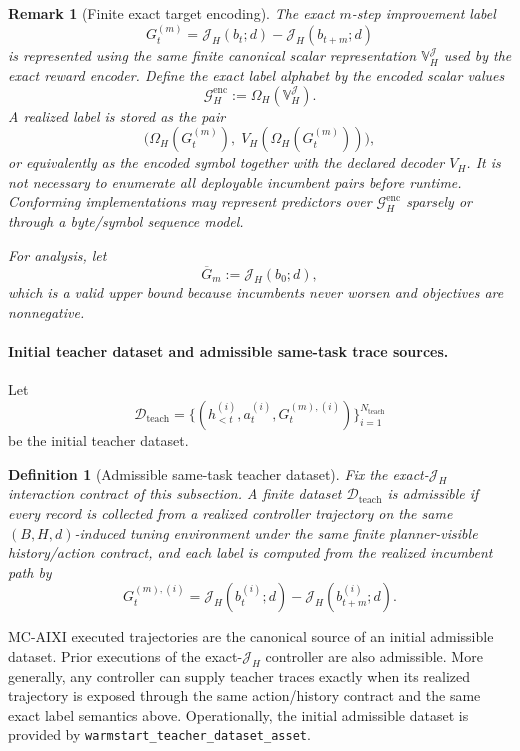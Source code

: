 \documentclass[11pt]{article}
\newtheorem{definition}{Definition}
\newtheorem{remark}{Remark}
\begin{document}
\begin{remark}[Finite exact target encoding]
The exact $m$-step improvement label
\[
G_t^{(m)}
=
\mathcal{J}_H(b_t;d)-\mathcal{J}_H(b_{t+m};d)
\]
is represented using the same finite canonical scalar representation
$\mathbb{V}_H^{\mathcal J}$ used by the exact reward encoder. Define the exact
label alphabet by the encoded scalar values
\[
\mathcal{G}_H^{\mathrm{enc}}:=\Omega_H(\mathbb{V}_H^{\mathcal J}).
\]
A realized label is stored as the pair
\[
\bigl(\Omega_H(G_t^{(m)}),\;V_H(\Omega_H(G_t^{(m)}))\bigr),
\]
or equivalently as the encoded symbol together with the declared decoder
$V_H$. It is not necessary to enumerate all deployable incumbent pairs before
runtime. Conforming implementations may represent predictors over
$\mathcal{G}_H^{\mathrm{enc}}$ sparsely or through a byte/symbol sequence model.

For analysis, let
\[
\overline G_m:=\mathcal{J}_H(b_0;d),
\]
which is a valid upper bound because incumbents never worsen and objectives are
nonnegative.
\end{remark}

\paragraph{Initial teacher dataset and admissible same-task trace sources.}
Let
\[
\mathcal{D}_{\mathrm{teach}}
=
\bigl\{
(h_{<t}^{(i)},a_t^{(i)},G_t^{(m),(i)})
\bigr\}_{i=1}^{N_{\mathrm{teach}}}
\]
be the initial teacher dataset.

\begin{definition}[Admissible same-task teacher dataset]
\label{def:admissible-teacher}
Fix the exact-$\mathcal{J}_H$ interaction contract of this subsection.
A finite dataset $\mathcal{D}_{\mathrm{teach}}$ is \emph{admissible} if every
record is collected from a realized controller trajectory on the same
$(B,H,d)$-induced tuning environment under the same finite planner-visible
history/action contract, and each label is computed from the realized
incumbent path by
\[
G_t^{(m),(i)}
=
\mathcal{J}_H(b_t^{(i)};d)-\mathcal{J}_H(b_{t+m}^{(i)};d).
\]
\end{definition}

MC-AIXI executed trajectories are the canonical source of an initial admissible
dataset. Prior executions of the exact-$\mathcal{J}_H$ controller are also
admissible. More generally, any controller can supply teacher traces exactly
when its realized trajectory is exposed through the same action/history
contract and the same exact label semantics above. Operationally, the initial
admissible dataset is provided by
\texttt{warmstart\_teacher\_dataset\_asset}.
\end{document}
